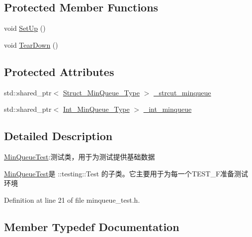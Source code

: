 \subsection*{Protected Member Functions}
\begin{DoxyCompactItemize}
\item 
void \hyperlink{class_min_queue_test_ae801d45bf78b7bb80b278264d3a8e96a}{Set\+Up} ()
\item 
void \hyperlink{class_min_queue_test_a3e949d54ecada54f713ff47d80eb513c}{Tear\+Down} ()
\end{DoxyCompactItemize}
\subsection*{Protected Attributes}
\begin{DoxyCompactItemize}
\item 
std\+::shared\+\_\+ptr$<$ \hyperlink{class_min_queue_test_a9b7e5e987d5e856adc5beb6986dd96a3}{Struct\+\_\+\+Min\+Queue\+\_\+\+Type} $>$ \hyperlink{class_min_queue_test_aed079eb9c6dd8460cc785b0fc6088a97}{\+\_\+strcut\+\_\+minqueue}
\item 
std\+::shared\+\_\+ptr$<$ \hyperlink{class_min_queue_test_ad81df38acc845934accb320c4dbdd582}{Int\+\_\+\+Min\+Queue\+\_\+\+Type} $>$ \hyperlink{class_min_queue_test_a03f9ea0fcc4b820a539d32d6539c2df9}{\+\_\+int\+\_\+minqueue}
\end{DoxyCompactItemize}


\subsection{Detailed Description}
\hyperlink{class_min_queue_test}{Min\+Queue\+Test}\+:测试类，用于为测试提供基础数据 

{\ttfamily \hyperlink{class_min_queue_test}{Min\+Queue\+Test}}是 {\ttfamily \+::testing\+::\+Test} 的子类。它主要用于为每一个{\ttfamily T\+E\+S\+T\+\_\+\+F}准备测试环境 

Definition at line 21 of file minqueue\+\_\+test.\+h.



\subsection{Member Typedef Documentation}
\hypertarget{class_min_queue_test_a627ceae9e25205d70955137bbfc863fd}{}
